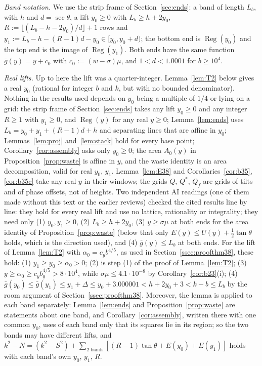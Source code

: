 \documentclass[11pt]{amsart}
\newcommand{\Reg}{\operatorname{Reg}}
\theoremstyle{definition}
\theoremstyle{remark}
\numberwithin{equation}{section}
\begin{document}
\emph{Band notation.} We use the strip frame of Section~\ref{sec:ends}: a band of length $L_b$, with $h$ and $d=\sec\theta$,
a lift $y_0\ge0$ with $L_b\ge h+2y_0$, $R:=\lfloor(L_b-h-2y_0)/d\rfloor+1$ rows and $y_1:=L_b-h-(R-1)d-y_0\in[y_0,y_0+d)$;
the bottom end is $\Reg(y_0)$ and the top end is the image of $\Reg(y_1)$. Both ends have the same function
$\bar g(y)=y+c_0$ with $c_0:=(w-\sigma)\mu$, and $1<d<1.0001$ for $b\ge10^4$.

\emph{Real lifts.} Up to here the lift was a quarter-integer. Lemma~\ref{lem:T2} below gives a real $y_0$ (rational for
integer $b$ and $k$, but with no bounded denominator). Nothing in the results used depends on $y_0$ being a multiple of
$1/4$ or lying on a grid: the strip frame of Section~\ref{sec:ends} takes any lift $y_0\ge0$ and any integer $R\ge1$ with
$y_1\ge0$, and $\Reg(y)$ for any real $y\ge0$; Lemma~\ref{lem:ends} uses $L_b=y_0+y_1+(R-1)d+h$ and separating lines that
are affine in $y_0$; Lemmas~\ref{lem:proj} and~\ref{lem:stack} hold for every base point; Corollary~\ref{cor:assembly} asks
only $y_0\ge0$; the area $A_0(y)$ in Proposition~\ref{prop:waste} is affine in $y$, and the waste identity is an area
decomposition, valid for real $y_0$, $y_1$. Lemma~\ref{lem:E38} and Corollaries~\ref{cor:b35}, \ref{cor:b35c} take any
real $y$ in their windows; the grids $Q$, $Q^*$, $Q_f$ are grids of tilts and of phase offsets, not of heights. Two
independent AI readings (one of them made without this text or the earlier reviews) checked the cited results line by
line: they hold for every real lift and use no lattice, rationality or integrality; they need only (1) $y_0,y_1\ge0$,
(2) $L_b\ge h+2y_0$, (3) $y\ge\sigma\mu$ at both ends for the area identity of Proposition~\ref{prop:waste} (below that
only $E(y)\le U(y)+\frac12\tan\theta$ holds, which is the direction used), and (4) $\bar g(y)\le L_b$ at both ends. For the
lift of Lemma~\ref{lem:T2} with $\alpha_0=c_yb^{4/5}$, as used in Section~\ref{ssec:proofthm38}, these hold: (1)
$y_1\ge y_0\ge\alpha_0>0$; (2) is step (1) of the proof of Lemma~\ref{lem:T2}; (3) $y\ge\alpha_0\ge c_yb_0^{4/5}>8\cdot10^4$, while
$\sigma\mu\le4.1\cdot10^{-8}$ by Corollary~\ref{cor:b23}(i); (4) $\bar g(y_0)\le\bar g(y_1)\le y_1+\Delta\le y_0+3.000001
<h+2y_0+3<k-b\le L_b$ by the room argument of Section~\ref{ssec:proofthm38}. Moreover, the lemma is applied to each band
separately: Lemma~\ref{lem:ends} and Proposition~\ref{prop:waste} are statements about one band, and
Corollary~\ref{cor:assembly}, written there with one common $y_0$, uses of each band only that its squares lie in its
region; so the two bands may have different lifts, and $k^2-N=(k^2-S^2)+\sum_{\text{2 bands}}[(R-1)\tan\theta+E(y_0)+E(y_1)]$
holds with each band's own $y_0$, $y_1$, $R$.
\end{document}
